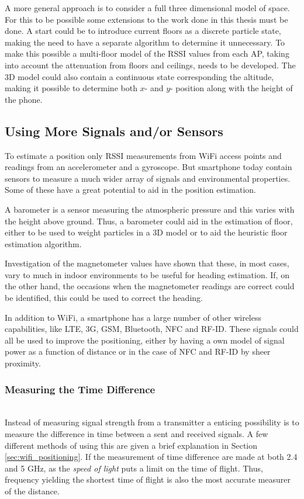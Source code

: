 \documentclass{LTHthesis}
\begin{document}
A more general approach is to consider a full three dimensional model of space. For this to be possible some extensions to the work done in this thesis must be done. A start could be to introduce current floors as a discrete particle state, making the need to have a separate algorithm to determine it unnecessary. To make this possible a multi-floor model of the RSSI values from each AP, taking into account the attenuation from floors and ceilings, needs to be developed. The 3D model could also contain a continuous state corresponding the altitude, making it possible to determine both $x$- and $y$- position along with the height of the phone. 
%
\subsection{Using More Signals and/or Sensors}
%
To estimate a position only RSSI measurements from WiFi access points and readings from an accelerometer and a gyroscope. But smartphone today contain sensors to measure a much wider array of signals and environmental properties. Some of these have a great potential to aid in the position estimation.

A barometer is a sensor measuring the atmospheric pressure and this varies with the height above ground. Thus, a barometer could aid in the estimation of floor, either to be used to weight particles in a 3D model or to aid the heuristic floor estimation algorithm.

Investigation of the magnetometer values have shown that these, in most cases, vary to much in indoor environments to be useful for heading estimation. If, on the other hand, the occasions when the magnetometer readings are correct could be identified, this could be used to correct the heading.

In addition to WiFi, a smartphone has a large number of other wireless capabilities, like LTE, 3G, GSM, Bluetooth, NFC and RF-ID. These signals could all be used to improve the positioning, either by having a own model of signal power as a function of distance or in the case of NFC and RF-ID by sheer proximity.         

\subsubsection{Measuring the Time Difference}~\\
Instead of measuring signal strength from a transmitter a enticing possibility is to measure the difference in time between a sent and received signals. A few different methods of using this are given a brief explanation in Section \ref{sec:wifi_positioning}. If the measurement of time difference are made at both 2.4 and 5 GHz, as the \emph{speed of light} puts a limit on the time of flight. Thus, frequency yielding the shortest time of flight is also the most accurate measurer of the distance.   
%
\end{document}
